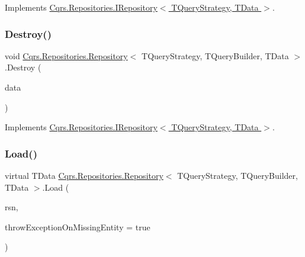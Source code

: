 Implements \hyperlink{interfaceCqrs_1_1Repositories_1_1IRepository_a0da5f756a0fd184dc51a81741f82734a_a0da5f756a0fd184dc51a81741f82734a}{Cqrs.\+Repositories.\+I\+Repository$<$ T\+Query\+Strategy, T\+Data $>$}.

\mbox{\label{classCqrs_1_1Repositories_1_1Repository_a6ed69cb5542164d9de81b0fa8a549d3e_a6ed69cb5542164d9de81b0fa8a549d3e}} 
\subsubsection{\texorpdfstring{Destroy()}{Destroy()}}
{\footnotesize\ttfamily void \hyperlink{classCqrs_1_1Repositories_1_1Repository}{Cqrs.\+Repositories.\+Repository}$<$ T\+Query\+Strategy, T\+Query\+Builder, T\+Data $>$.Destroy (\begin{DoxyParamCaption}\item[{T\+Data}]{data }\end{DoxyParamCaption})}



Implements \hyperlink{interfaceCqrs_1_1Repositories_1_1IRepository_a3a7a60be19498813b3822558b88fad66_a3a7a60be19498813b3822558b88fad66}{Cqrs.\+Repositories.\+I\+Repository$<$ T\+Query\+Strategy, T\+Data $>$}.

\mbox{\label{classCqrs_1_1Repositories_1_1Repository_a444e9dfe4710be90940dbb6dec9d856f_a444e9dfe4710be90940dbb6dec9d856f}} 
\subsubsection{\texorpdfstring{Load()}{Load()}}
{\footnotesize\ttfamily virtual T\+Data \hyperlink{classCqrs_1_1Repositories_1_1Repository}{Cqrs.\+Repositories.\+Repository}$<$ T\+Query\+Strategy, T\+Query\+Builder, T\+Data $>$.Load (\begin{DoxyParamCaption}\item[{Guid}]{rsn,  }\item[{bool}]{throw\+Exception\+On\+Missing\+Entity = {\ttfamily true} }\end{DoxyParamCaption})\hspace{0.3cm}{\ttfamily [virtual]}}



